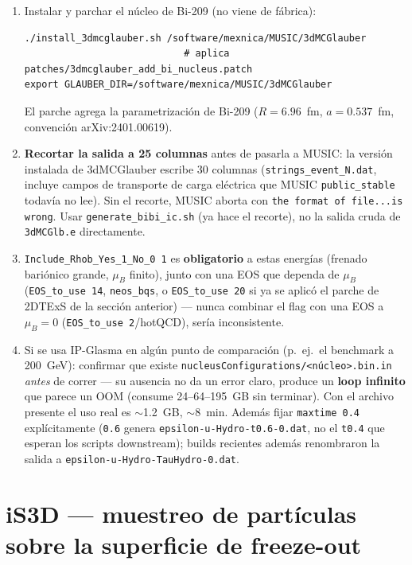\documentclass[11pt]{article}
\begin{document}
\begin{enumerate}[leftmargin=*]
  \item Instalar y parchar el núcleo de Bi-209 (no viene de fábrica):
\begin{Verbatim}[fontsize=\small]
./install_3dmcglauber.sh /software/mexnica/MUSIC/3dMCGlauber
                            # aplica patches/3dmcglauber_add_bi_nucleus.patch
export GLAUBER_DIR=/software/mexnica/MUSIC/3dMCGlauber
\end{Verbatim}
  El parche agrega la parametrización de Bi-209 ($R=6.96$~fm, $a=0.537$~fm,
  convención arXiv:2401.00619).
  \item \textbf{Recortar la salida a 25 columnas} antes de pasarla a MUSIC:
  la versión instalada de 3dMCGlauber escribe 30 columnas
  (\texttt{strings\_event\_N.dat}, incluye campos de transporte de carga
  eléctrica que MUSIC \texttt{public\_stable} todavía no lee). Sin el
  recorte, MUSIC aborta con \texttt{the format of file...is wrong}. Usar
  \texttt{generate\_bibi\_ic.sh} (ya hace el recorte), no la salida cruda de
  \texttt{3dMCGlb.e} directamente.
  \item \texttt{Include\_Rhob\_Yes\_1\_No\_0 1} es \textbf{obligatorio} a
  estas energías (frenado bariónico grande, $\mu_B$ finito), junto con una
  EOS que dependa de $\mu_B$ (\texttt{EOS\_to\_use 14}, \texttt{neos\_bqs},
  o \texttt{EOS\_to\_use 20} si ya se aplicó el parche de 2DTExS de la
  sección anterior) --- nunca combinar el flag con una EOS a $\mu_B=0$
  (\texttt{EOS\_to\_use 2}/hotQCD), sería inconsistente.
  \item Si se usa IP-Glasma en algún punto de comparación (p.\ ej.\ el
  benchmark a 200~GeV): confirmar que existe
  \texttt{nucleusConfigurations/<núcleo>.bin.in} \emph{antes} de correr ---
  su ausencia no da un error claro, produce un \textbf{loop infinito} que
  parece un OOM (consume 24--64--195~GB sin terminar). Con el archivo
  presente el uso real es $\sim$1.2~GB, $\sim$8~min. Además fijar
  \texttt{maxtime 0.4} explícitamente (\texttt{0.6} genera
  \texttt{epsilon-u-Hydro-t0.6-0.dat}, no el \texttt{t0.4} que esperan los
  scripts downstream); builds recientes además renombraron la salida a
  \texttt{epsilon-u-Hydro-TauHydro-0.dat}.
\end{enumerate}

\section{iS3D --- muestreo de partículas sobre la superficie de freeze-out}
\end{document}
